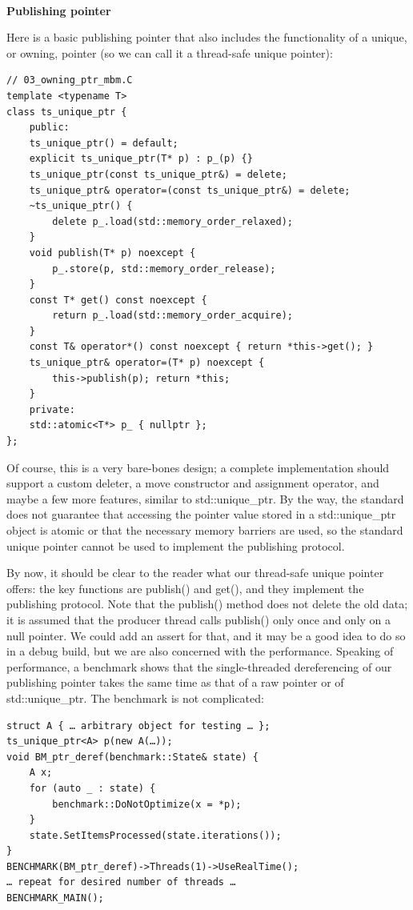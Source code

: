 \hspace*{\fill} \\ %
\noindent
\textbf{Publishing pointer}

Here is a basic publishing pointer that also includes the functionality of a unique, or owning, pointer (so we can call it a thread-safe unique pointer):

\begin{lstlisting}[style=styleCXX]
// 03_owning_ptr_mbm.C
template <typename T>
class ts_unique_ptr {
	public:
	ts_unique_ptr() = default;
	explicit ts_unique_ptr(T* p) : p_(p) {}
	ts_unique_ptr(const ts_unique_ptr&) = delete;
	ts_unique_ptr& operator=(const ts_unique_ptr&) = delete;
	~ts_unique_ptr() {
		delete p_.load(std::memory_order_relaxed);
	}
	void publish(T* p) noexcept {
		p_.store(p, std::memory_order_release);
	}
	const T* get() const noexcept {
		return p_.load(std::memory_order_acquire);
	}
	const T& operator*() const noexcept { return *this->get(); }
	ts_unique_ptr& operator=(T* p) noexcept {
		this->publish(p); return *this;
	}
	private:
	std::atomic<T*> p_ { nullptr };
};
\end{lstlisting}

Of course, this is a very bare-bones design; a complete implementation should support a custom deleter, a move constructor and assignment operator, and maybe a few more features, similar to std::unique\_ptr. By the way, the standard does not guarantee that accessing the pointer value stored in a std::unique\_ptr object is atomic or that the necessary memory barriers are used, so the standard unique pointer cannot be used to implement the publishing protocol.

By now, it should be clear to the reader what our thread-safe unique pointer offers: the key functions are publish() and get(), and they implement the publishing protocol. Note that the publish() method does not delete the old data; it is assumed that the producer thread calls publish() only once and only on a null pointer. We could add an assert for that, and it may be a good idea to do so in a debug build, but we are also concerned with the performance. Speaking of performance, a benchmark shows that the single-threaded dereferencing of our publishing pointer takes the same time as that of a raw pointer or of std::unique\_ptr. The benchmark is not complicated:

\begin{lstlisting}[style=styleCXX]
struct A { … arbitrary object for testing … };
ts_unique_ptr<A> p(new A(…));
void BM_ptr_deref(benchmark::State& state) {
	A x;
	for (auto _ : state) {
		benchmark::DoNotOptimize(x = *p);
	}
	state.SetItemsProcessed(state.iterations());
}
BENCHMARK(BM_ptr_deref)->Threads(1)->UseRealTime();
… repeat for desired number of threads …
BENCHMARK_MAIN();
\end{lstlisting}

